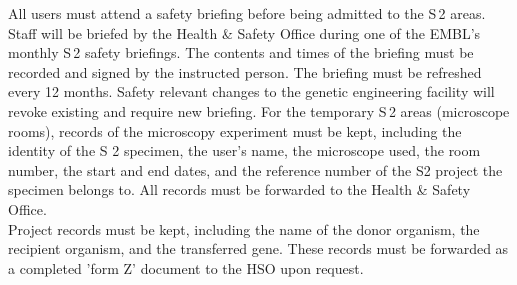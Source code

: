 All users must attend a safety briefing before being admitted to the S\,2 areas. Staff will be briefed by the Health \& Safety Office during one of the EMBL’s monthly S\,2 safety briefings. The contents and times of the briefing must be recorded and signed by the instructed person. The briefing must be refreshed every 12 months. Safety relevant changes to the genetic engineering facility will revoke existing and require new briefing. For the temporary S\,2 areas (microscope rooms), records of the microscopy experiment must be kept, including the identity of the S 2 specimen, the user's name, the microscope used, the room number, the start and end dates, and the reference number of the S2 project the specimen belongs to. All records must be forwarded to the Health \& Safety Office.\\
\newline
Project records must be kept, including the name of the donor organism, the recipient organism, and the transferred gene. These records must be forwarded as a completed 'form Z' document to the HSO upon request.
